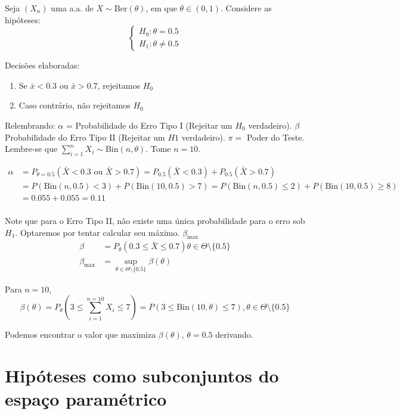 \documentclass[
  letterpaper,
  DIV=11,
  numbers=noendperiod]{scrreprt}
\providecommand{\tightlist}{%
  \setlength{\itemsep}{0pt}\setlength{\parskip}{0pt}}\usepackage{longtable,booktabs,array}
\begin{document}
Seja \((X_{n})\) uma a.a. de \(X\sim\mathrm{Ber}(\theta)\), em que
\(\theta \in (0,1)\). Considere as hipóteses: \[
\begin{cases}
H_{0}: \theta =0.5 \\
H_{1}: \theta \neq 0.5
\end{cases}
\]

Decisões elaboradas:

\begin{enumerate}
\def\labelenumi{\arabic{enumi}.}
\tightlist
\item
  Se \(\bar{x}<0.3\) ou \(\bar{x} > 0.7\), rejeitamos \(H_{0}\)
\item
  Caso contrário, não rejeitamos \(H_0\)
\end{enumerate}

Relembrando: \(\alpha\) = Probabilidade do Erro Tipo I (Rejeitar um
\(H_0\) verdadeiro). \(\beta\) Probabilidade do Erro Tipo II (Rejeitar
um \(H1\) verdadeiro). \(\pi =\) Poder do Teste. Lembre-se que
\(\sum^n_{i=1}X_{i}\sim \mathrm{Bin}(n,\theta)\). Tome \(n =10\).

\[
\begin{aligned}
\alpha &= P_{\theta=0.5}(\bar{X} < 0.3 \text{ ou } \bar{X} > 0.7) = P_{0.5}(\bar{X}<0.3) + P_{0.5}(\bar{X}>0.7) \\
&=P(\mathrm{Bin}(n,0.5) < 3) + P(\mathrm{Bin}(10,0.5)>7) =P(\mathrm{Bin}(n,0.5) \leq 2) + P(\mathrm{Bin}(10,0.5)\geq 8) \\
&= 0.055 +0.055 = 0.11 \\
\end{aligned}
\]

Note que para o Erro Tipo II, não existe uma única probabilidade para o
erro sob \(H_1\). Optaremos por tentar calcular seu máximo.
\(\beta_{\max}\) \[
\begin{aligned}
\beta &= P_{\theta} (0.3\leq \bar{X} \leq 0.7) \theta \in \Theta \setminus \{ 0.5 \} \\
\beta_{\max} &= \sup_{\theta \in \Theta \setminus \{ 0.5 \}} \beta(\theta)
\end{aligned}
\]

Para \(n=10\), \[
\beta(\theta) = P_{\theta}\left( 3\leq \sum^{n=10}_{i=1} X_{i} \leq 7 \right) = P\left( 3\leq \mathrm{Bin}(10,\theta)
\leq 7 \right), \theta \in \Theta \setminus \{ 0.5 \}
\]

Podemos encontrar o valor que maximiza \(\beta(\theta)\),
\(\theta =0.5\) derivando.

\section{Hipóteses como subconjuntos do espaço
paramétrico}\label{hipuxf3teses-como-subconjuntos-do-espauxe7o-paramuxe9trico}
\end{document}
